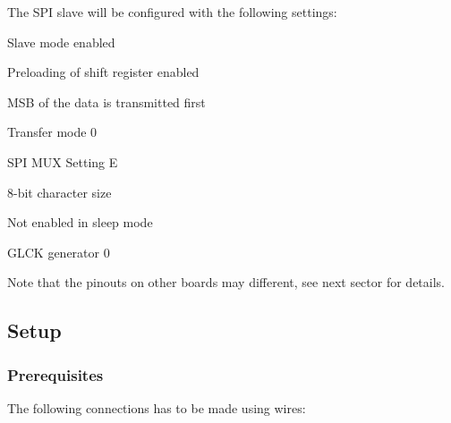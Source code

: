 The S\+PI slave will be configured with the following settings\+:
\begin{DoxyItemize}
\item Slave mode enabled
\item Preloading of shift register enabled
\item M\+SB of the data is transmitted first
\item Transfer mode 0
\item S\+PI M\+UX Setting E
\item 8-\/bit character size
\item Not enabled in sleep mode
\item G\+L\+CK generator 0
\end{DoxyItemize}

Note that the pinouts on other boards may different, see next sector for details.\hypertarget{asfdoc_sam0_sercom_spi_dma_use_case_asfdoc_sam0_sercom_spi_dma_use_case_setup}{}\subsection{Setup}\label{asfdoc_sam0_sercom_spi_dma_use_case_asfdoc_sam0_sercom_spi_dma_use_case_setup}
\hypertarget{asfdoc_sam0_sercom_spi_dma_use_case_asfdoc_sam0_sercom_spi_dma_use_case_prereq}{}\subsubsection{Prerequisites}\label{asfdoc_sam0_sercom_spi_dma_use_case_asfdoc_sam0_sercom_spi_dma_use_case_prereq}
The following connections has to be made using wires\+:
